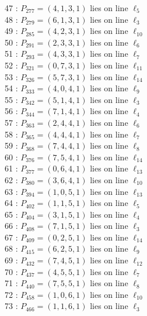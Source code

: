 \documentclass{article}
\begin{document}
{\begin{multicols}{2}
47 : $P_{277}=( 4, 1, 3, 1 )$ lies on line $\ell_{5}$\\
48 : $P_{279}=( 6, 1, 3, 1 )$ lies on line $\ell_{3}$\\
49 : $P_{285}=( 4, 2, 3, 1 )$ lies on line $\ell_{10}$\\
50 : $P_{291}=( 2, 3, 3, 1 )$ lies on line $\ell_{6}$\\
51 : $P_{293}=( 4, 3, 3, 1 )$ lies on line $\ell_{7}$\\
52 : $P_{321}=( 0, 7, 3, 1 )$ lies on line $\ell_{11}$\\
53 : $P_{326}=( 5, 7, 3, 1 )$ lies on line $\ell_{14}$\\
54 : $P_{333}=( 4, 0, 4, 1 )$ lies on line $\ell_{9}$\\
55 : $P_{342}=( 5, 1, 4, 1 )$ lies on line $\ell_{3}$\\
56 : $P_{344}=( 7, 1, 4, 1 )$ lies on line $\ell_{4}$\\
57 : $P_{363}=( 2, 4, 4, 1 )$ lies on line $\ell_{6}$\\
58 : $P_{365}=( 4, 4, 4, 1 )$ lies on line $\ell_{7}$\\
59 : $P_{368}=( 7, 4, 4, 1 )$ lies on line $\ell_{8}$\\
60 : $P_{376}=( 7, 5, 4, 1 )$ lies on line $\ell_{14}$\\
61 : $P_{377}=( 0, 6, 4, 1 )$ lies on line $\ell_{13}$\\
62 : $P_{380}=( 3, 6, 4, 1 )$ lies on line $\ell_{10}$\\
63 : $P_{394}=( 1, 0, 5, 1 )$ lies on line $\ell_{13}$\\
64 : $P_{402}=( 1, 1, 5, 1 )$ lies on line $\ell_{5}$\\
65 : $P_{404}=( 3, 1, 5, 1 )$ lies on line $\ell_{4}$\\
66 : $P_{408}=( 7, 1, 5, 1 )$ lies on line $\ell_{3}$\\
67 : $P_{409}=( 0, 2, 5, 1 )$ lies on line $\ell_{14}$\\
68 : $P_{415}=( 6, 2, 5, 1 )$ lies on line $\ell_{9}$\\
69 : $P_{432}=( 7, 4, 5, 1 )$ lies on line $\ell_{12}$\\
70 : $P_{437}=( 4, 5, 5, 1 )$ lies on line $\ell_{7}$\\
71 : $P_{440}=( 7, 5, 5, 1 )$ lies on line $\ell_{8}$\\
72 : $P_{458}=( 1, 0, 6, 1 )$ lies on line $\ell_{10}$\\
73 : $P_{466}=( 1, 1, 6, 1 )$ lies on line $\ell_{3}$\\

\end{multicols}}
\end{document}
